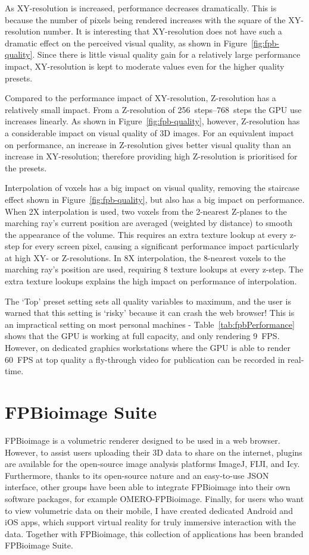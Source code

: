 As XY-resolution is increased, performance decreases dramatically. 
This is because the number of pixels being rendered increases with the square of the XY-resolution number. 
It is interesting that XY-resolution does not have such a dramatic effect on the perceived visual quality, as shown in Figure~\ref{fig:fpb-quality}. 
Since there is little visual quality gain for a relatively large performance impact, XY-resolution is kept to moderate values even for the higher quality presets. 

Compared to the performance impact of XY-resolution, Z-resolution has a relatively small impact. 
From a Z-resolution of \SIrange{256}{768}{steps} the GPU use increases linearly. 
As shown in Figure~\ref{fig:fpb-quality}, however, Z-resolution has a considerable impact on visual quality of 3D images. 
For an equivalent impact on performance, an increase in Z-resolution gives better visual quality than an increase in XY-resolution; therefore providing high Z-resolution is prioritised for the presets. 

Interpolation of voxels has a big impact on visual quality, removing the staircase effect shown in Figure~\ref{fig:fpb-quality}, but also has a big impact on performance. 
When 2X interpolation is used, two voxels from the 2-nearest Z-planes to the marching ray's current position are averaged (weighted by distance) to smooth the appearance of the volume. 
This requires an extra texture lookup at every z-step for every screen pixel, causing a significant performance impact particularly at high XY- or Z-resolutions. 
In 8X interpolation, the 8-nearest voxels to the marching ray's position are used, requiring 8 texture lookups at every z-step. 
The extra texture lookups explains the high impact on performance of interpolation. 

The `Top' preset setting sets all quality variables to maximum, and the user is warned that this setting is `risky' because it can crash the web browser!
This is an impractical setting on most personal machines - Table~\ref{tab:fpbPerformance} shows that the GPU is working at full capacity, and only rendering \SI{9}{FPS}. 
However, on dedicated graphics workstations where the GPU is able to render \SI{60}{FPS} at top quality a fly-through video for publication can be recorded in real-time. 

\section{FPBioimage Suite}
FPBioimage is a volumetric renderer designed to be used in a web browser. 
However, to assist users uploading their 3D data to share on the internet, plugins are available for the open-source image analysis platforms ImageJ, FIJI, and Icy. 
Furthermore, thanks to its open-source nature and an easy-to-use JSON interface, other groups have been able to integrate FPBioimage into their own software packages, for example OMERO-FPBioimage. 
Finally, for users who want to view volumetric data on their mobile, I have created dedicated Android and iOS apps, which support virtual reality for truly immersive interaction with the data. %
Together with FPBioimage, this collection of applications has been branded FPBioimage Suite.


